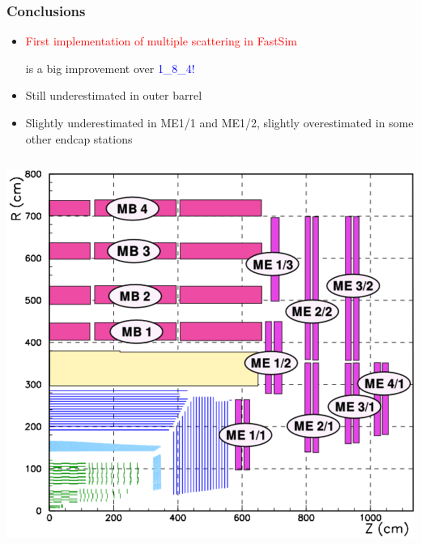 \documentclass[compress]{beamer}
\begin{document}

\begin{frame}
\frametitle{Conclusions}

\begin{itemize}\setlength{\itemsep}{0.2 cm}
\item \textcolor{red}{First implementation of multiple scattering in FastSim}

is a big improvement over \textcolor{blue}{1\_8\_4!}
\item Still underestimated in outer barrel
\item Slightly underestimated in ME1/1 and ME1/2, slightly overestimated in some other endcap stations
\end{itemize}

\begin{columns}
\includegraphics[width=\linewidth]{muon_system.png}


\end{columns}
\end{frame}
\end{document}

